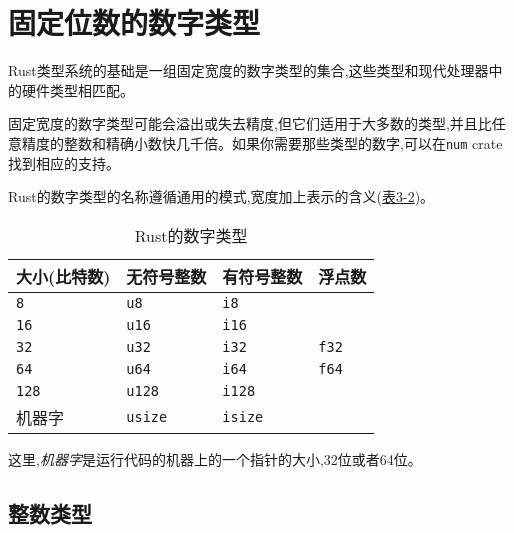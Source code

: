 \section{固定位数的数字类型}
Rust类型系统的基础是一组固定宽度的数字类型的集合,这些类型和现代处理器中的硬件类型相匹配。

固定宽度的数字类型可能会溢出或失去精度,但它们适用于大多数的类型,并且比任意精度的整数和精确小数快几千倍。如果你需要那些类型的数字,可以在\texttt{num} crate找到相应的支持。

Rust的数字类型的名称遵循通用的模式,宽度加上表示的含义(\hyperref[t3-2]{表3-2})。
\begin{table}[htbp]
    \centering
    \caption{Rust的数字类型}
    \label{t3-2}
    \begin{tabular}{llll}
        \hline
        \textbf{大小(比特数)}   & \textbf{无符号整数}   & \textbf{有符号整数}   & \textbf{浮点数}   \\
        \hline
        \texttt{8}  & \texttt{u8}   & \texttt{i8}   &              \\
        \rowcolor{tablecolor} 
        \texttt{16} & \texttt{u16}  & \texttt{i16}  &              \\
        \texttt{32} & \texttt{u32}  & \texttt{i32}  & \texttt{f32} \\
        \rowcolor{tablecolor} 
        \texttt{64} & \texttt{u64}  & \texttt{i64}  & \texttt{f64} \\
        \texttt{128}& \texttt{u128} & \texttt{i128} &              \\
        \rowcolor{tablecolor} 
        机器字      & \texttt{usize} & \texttt{isize} & \\
    \end{tabular}
\end{table}

这里,\emph{机器字}是运行代码的机器上的一个指针的大小,32位或者64位。

\subsection{整数类型}


